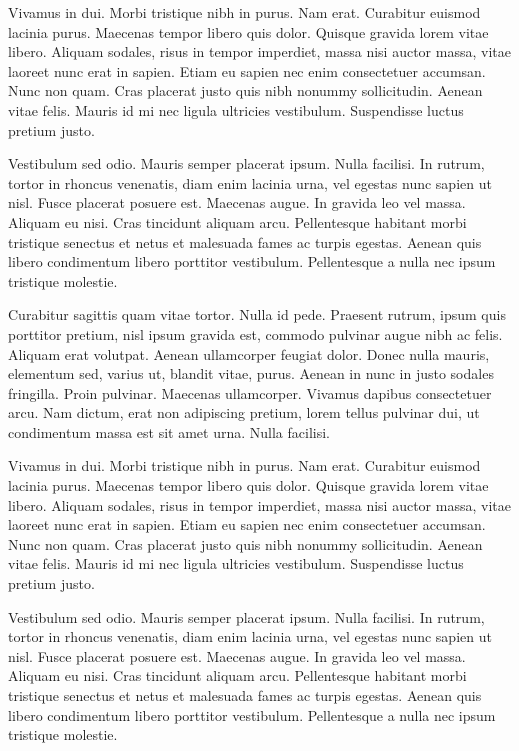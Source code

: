 Vivamus in dui. Morbi tristique nibh in purus. Nam erat. Curabitur euismod lacinia purus. Maecenas tempor libero quis dolor. Quisque gravida lorem vitae libero. Aliquam sodales, risus in tempor imperdiet, massa nisi auctor massa, vitae laoreet nunc erat in sapien. Etiam eu sapien nec enim consectetuer accumsan. Nunc non quam. Cras placerat justo quis nibh nonummy sollicitudin. Aenean vitae felis. Mauris id mi nec ligula ultricies vestibulum. Suspendisse luctus pretium justo. 

Vestibulum sed odio. Mauris semper placerat ipsum. Nulla facilisi. In rutrum, tortor in rhoncus venenatis, diam enim lacinia urna, vel egestas nunc sapien ut nisl. Fusce placerat posuere est. Maecenas augue. In gravida leo vel massa. Aliquam eu nisi. Cras tincidunt aliquam arcu. Pellentesque habitant morbi tristique senectus et netus et malesuada fames ac turpis egestas. Aenean quis libero condimentum libero porttitor vestibulum. Pellentesque a nulla nec ipsum tristique molestie.

Curabitur sagittis quam vitae tortor. Nulla id pede. Praesent rutrum, ipsum quis porttitor pretium, nisl ipsum gravida est, commodo pulvinar augue nibh ac felis. Aliquam erat volutpat. Aenean ullamcorper feugiat dolor. Donec nulla mauris, elementum sed, varius ut, blandit vitae, purus. Aenean in nunc in justo sodales fringilla. Proin pulvinar. Maecenas ullamcorper. Vivamus dapibus consectetuer arcu. Nam dictum, erat non adipiscing pretium, lorem tellus pulvinar dui, ut condimentum massa est sit amet urna. Nulla facilisi.

Vivamus in dui. Morbi tristique nibh in purus. Nam erat. Curabitur euismod lacinia purus. Maecenas tempor libero quis dolor. Quisque gravida lorem vitae libero. Aliquam sodales, risus in tempor imperdiet, massa nisi auctor massa, vitae laoreet nunc erat in sapien. Etiam eu sapien nec enim consectetuer accumsan. Nunc non quam. Cras placerat justo quis nibh nonummy sollicitudin. Aenean vitae felis. Mauris id mi nec ligula ultricies vestibulum. Suspendisse luctus pretium justo. 

Vestibulum sed odio. Mauris semper placerat ipsum. Nulla facilisi. In rutrum, tortor in rhoncus venenatis, diam enim lacinia urna, vel egestas nunc sapien ut nisl. Fusce placerat posuere est. Maecenas augue. In gravida leo vel massa. Aliquam eu nisi. Cras tincidunt aliquam arcu. Pellentesque habitant morbi tristique senectus et netus et malesuada fames ac turpis egestas. Aenean quis libero condimentum libero porttitor vestibulum. Pellentesque a nulla nec ipsum tristique molestie.

